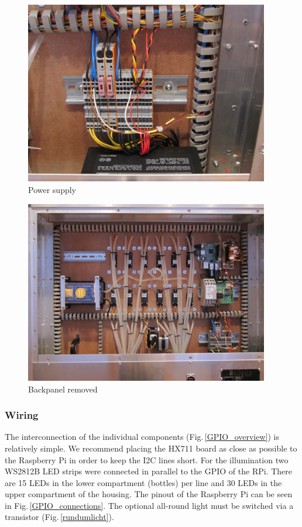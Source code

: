 \documentclass[a4paper]{scrartcl}
\begin{document}
\begin{figure}
  \centering
  \includegraphics[height=8cm]{pics/psu}
  \caption{Power supply} \label{psu}
\end{figure}

\begin{figure}
  \centering
  \includegraphics[height=8cm]{pics/electronic_overview}
  \caption{Backpanel removed} \label{electronic_overview}
\end{figure}

\subsubsection{Wiring}
The interconnection of the individual components (Fig.\,\ref{GPIO_overview}) is relatively simple. We recommend placing the HX711 board as close as possible to the Raspberry Pi in order to keep the I2C lines short. For the illumination two WS2812B LED strips were connected in parallel to the GPIO of the RPi. There are 15 LEDs in the lower compartment (bottles) per line and 30 LEDs in the upper compartment of the housing. The pinout of the Raspberry Pi can be seen in Fig.\,\ref{GPIO_connections}. The optional all-round light must be switched via a transistor (Fig.\,\ref{rundumlicht}).  
\end{document}
